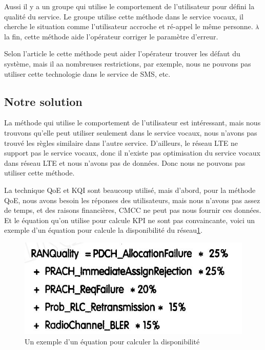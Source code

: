 Aussi il y a un groupe qui utilise le comportement de l'utilisateur pour défini la qualité du service\cite{UB}. Le groupe utilise cette méthode dans le service vocaux, il cherche le situation comme l'utilisateur accroche et ré-appel le même personne. \textsc{à} la fin, cette méthode aide l'opérateur corriger le paramètre d'erreur.

Selon l'article le cette méthode peut aider l'opérateur trouver les défaut du système, mais il aa nombreuses restrictions, par exemple, nous ne pouvons pas utiliser cette technologie dans le service de SMS, etc.

\subsection{Notre solution}

La méthode qui utilise le comportement de l'utilisateur est intéressant, mais nous trouvons qu'elle peut utiliser seulement dans le service vocaux, nous n'avons pas trouvé les règles similaire dans l'autre service. D'ailleurs, le réseau LTE ne support pas le service vocaux, donc il n'existe pas optimisation du service vocaux dans réseau LTE et nous n'avons pas de données. Donc nous ne pouvons pas utiliser cette méthode.

La technique QoE et KQI sont beaucoup utilisé, mais d'abord, pour la méthode QoE, nous avons besoin les réponses des utilisateurs, mais nous n'avons pas assez de temps, et des raisons financières, CMCC ne peut pas nous fournir ces données. Et le équation qu'on utilise pour calcule KPI ne sont pas convaincante, voici un exemple d'un équation pour calcule la disponibilité du réseau\ref{fig:kpi}. 
\begin{figure}[H]
\centering
\includegraphics[width=0.7\linewidth]{images/kpi}
\caption{Un exemple d'un équation pour calculer la disponibilité}
\label{fig:kpi}
\end{figure}

